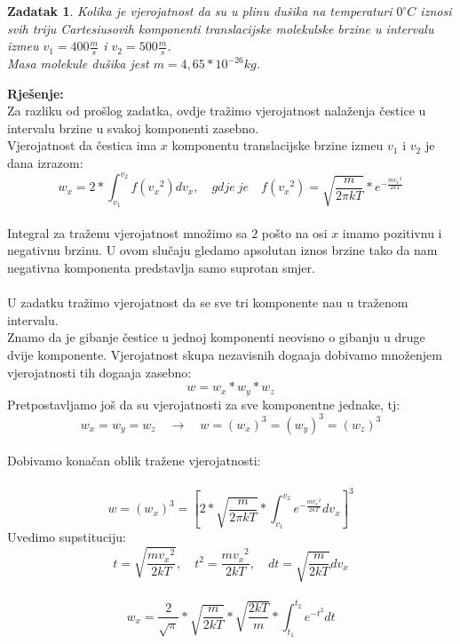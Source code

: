 \documentclass[a4paper,12pt]{article}
\newtheorem{ZDK}{Zadatak}[section]
\begin{document}
\newpage
\begin{ZDK}
	Kolika je vjerojatnost da su u plinu du\v{s}ika na temperaturi $0^{\circ}C$ iznosi svih triju Cartesiusovih komponenti translacijske molekulske brzine
	u intervalu izme\dj u $v_1=400\frac{m}{s}$ i $v_2=500\frac{m}{s}$. \\
	Masa molekule du\v{s}ika jest $m=4,65*10^{-26}kg$.
\end{ZDK}
\textbf{Rje\v{s}enje:} \\
\newline
Za razliku od pro\v{s}log zadatka, ovdje tra\v{z}imo vjerojatnost nala\v{z}enja \v{c}estice u intervalu brzine u svakoj komponenti zasebno. \\
Vjerojatnost da \v{c}estica ima $x$ komponentu translacijske brzine izme\dj u $v_1$ i $v_2$ je dana izrazom:
\\
$$ w_x=2*\int_{v_1}^{v_2}f({v_x}^2)dv_x, \quad gdje\ je \quad f({v_x}^2)=\sqrt{\frac{m}{2 \pi kT}}*e^{-\frac{m{v_x}^2}{2kT}} $$
\\
Integral za tra\v{z}enu vjerojatnost mno\v{z}imo sa $2$ po\v{s}to na osi $x$ imamo pozitivnu i negativnu brzinu. U ovom slu\v{c}aju gledamo 
apsolutan iznos brzine tako da nam negativna komponenta predstavlja samo suprotan smjer.
\\
\\
U zadatku tra\v{z}imo vjerojatnost da se sve tri komponente na\dj u u tra\v{z}enom intervalu. \\
Znamo da je gibanje \v{c}estice u jednoj komponenti neovisno o gibanju u druge dvije komponente.
Vjerojatnost skupa nezavisnih doga\dj aja dobivamo mno\v{z}enjem vjerojatnosti tih doga\dj aja zasebno:
$$ w=w_x*w_y*w_z $$
Pretpostavljamo jo\v{s} da su vjerojatnosti za sve komponentne jednake, tj:
$$ w_x=w_y=w_z \quad \rightarrow \quad w=(w_x)^3=(w_y)^3=(w_z)^3 $$
\\
Dobivamo kona\v{c}an oblik tra\v{z}ene vjerojatnosti:
\\
\\
$$ w=(w_x)^3=\left[ 2*\sqrt{\frac{m}{2 \pi kT}}* \int_{v_1}^{v_2} e^{-\frac{m{v_x}^2}{2kT}}dv_x \right]^3  $$
\newpage
Uvedimo supstituciju:
\\
$$ t=\sqrt{\frac{m{v_x}^2}{2kT}}, \quad t^2=\frac{m{v_x}^2}{2kT}, \quad dt=\sqrt{\frac{m}{2kT}}dv_x $$
\\
$$ w_x=\frac{2}{\sqrt{\pi}}*\sqrt{\frac{m}{2kT}}*\sqrt{\frac{2kT}{m}}*\int_{t_1}^{t_2}e^{{-t}^2}dt $$
\end{document}
